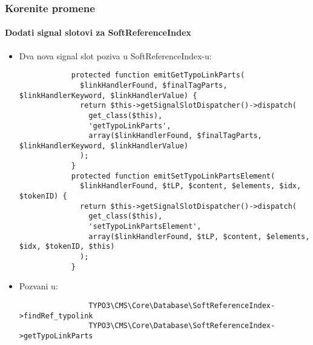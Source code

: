 \begin{frame}[fragile]
	\frametitle{Korenite promene}
	\framesubtitle{Dodati signal slotovi za SoftReferenceIndex}

	\lstset{
		basicstyle=\tiny\ttfamily
	}

	\begin{itemize}
		\item
			\smaller
				Dva nova signal slot poziva u SoftReferenceIndex-u:
			\normalsize

		\begin{lstlisting}
			protected function emitGetTypoLinkParts(
			  $linkHandlerFound, $finalTagParts, $linkHandlerKeyword, $linkHandlerValue) {
			  return $this->getSignalSlotDispatcher()->dispatch(
			    get_class($this),
			    'getTypoLinkParts',
			    array($linkHandlerFound, $finalTagParts, $linkHandlerKeyword, $linkHandlerValue)
			  );
			}
			protected function emitSetTypoLinkPartsElement(
			  $linkHandlerFound, $tLP, $content, $elements, $idx, $tokenID) {
			  return $this->getSignalSlotDispatcher()->dispatch(
			    get_class($this),
			    'setTypoLinkPartsElement',
			    array($linkHandlerFound, $tLP, $content, $elements, $idx, $tokenID, $this)
			  );
			}
		\end{lstlisting}

		\item
			\smaller
				Pozvani u:
			\normalsize

			\begin{lstlisting}
				TYPO3\CMS\Core\Database\SoftReferenceIndex->findRef_typolink
				TYPO3\CMS\Core\Database\SoftReferenceIndex->getTypoLinkParts
			\end{lstlisting}

	\end{itemize}

\end{frame}



